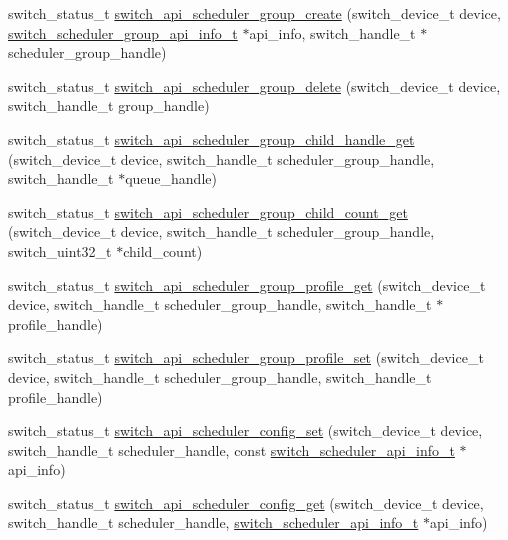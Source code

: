 \begin{DoxyCompactItemize}
\item 
switch\+\_\+status\+\_\+t \hyperlink{group__Scheduler_ga0c6971efaa94e45ddad4dc7f2a00b820}{switch\+\_\+api\+\_\+scheduler\+\_\+group\+\_\+create} (switch\+\_\+device\+\_\+t device, \hyperlink{structswitch__scheduler__group__api__info__}{switch\+\_\+scheduler\+\_\+group\+\_\+api\+\_\+info\+\_\+t} $\ast$api\+\_\+info, switch\+\_\+handle\+\_\+t $\ast$scheduler\+\_\+group\+\_\+handle)
\item 
switch\+\_\+status\+\_\+t \hyperlink{group__Scheduler_ga50131105ac33286610c4fb98da8d0be4}{switch\+\_\+api\+\_\+scheduler\+\_\+group\+\_\+delete} (switch\+\_\+device\+\_\+t device, switch\+\_\+handle\+\_\+t group\+\_\+handle)
\item 
switch\+\_\+status\+\_\+t \hyperlink{group__Scheduler_ga63059e09351364ae8b5ea84e6d4f8779}{switch\+\_\+api\+\_\+scheduler\+\_\+group\+\_\+child\+\_\+handle\+\_\+get} (switch\+\_\+device\+\_\+t device, switch\+\_\+handle\+\_\+t scheduler\+\_\+group\+\_\+handle, switch\+\_\+handle\+\_\+t $\ast$queue\+\_\+handle)
\item 
switch\+\_\+status\+\_\+t \hyperlink{group__Scheduler_gad5c3da4da4d6fd8a015512b4b50bb0b5}{switch\+\_\+api\+\_\+scheduler\+\_\+group\+\_\+child\+\_\+count\+\_\+get} (switch\+\_\+device\+\_\+t device, switch\+\_\+handle\+\_\+t scheduler\+\_\+group\+\_\+handle, switch\+\_\+uint32\+\_\+t $\ast$child\+\_\+count)
\item 
switch\+\_\+status\+\_\+t \hyperlink{group__Scheduler_ga28b0295a359b1d9e190936995877365a}{switch\+\_\+api\+\_\+scheduler\+\_\+group\+\_\+profile\+\_\+get} (switch\+\_\+device\+\_\+t device, switch\+\_\+handle\+\_\+t scheduler\+\_\+group\+\_\+handle, switch\+\_\+handle\+\_\+t $\ast$profile\+\_\+handle)
\item 
switch\+\_\+status\+\_\+t \hyperlink{group__Scheduler_ga570ab46c52ed357fd0aa585733805f11}{switch\+\_\+api\+\_\+scheduler\+\_\+group\+\_\+profile\+\_\+set} (switch\+\_\+device\+\_\+t device, switch\+\_\+handle\+\_\+t scheduler\+\_\+group\+\_\+handle, switch\+\_\+handle\+\_\+t profile\+\_\+handle)
\item 
switch\+\_\+status\+\_\+t \hyperlink{group__Scheduler_gab2e1ad365063f32962b89f163f88a4b5}{switch\+\_\+api\+\_\+scheduler\+\_\+config\+\_\+set} (switch\+\_\+device\+\_\+t device, switch\+\_\+handle\+\_\+t scheduler\+\_\+handle, const \hyperlink{group__Scheduler_ga3e981ad1a349d10503bfbba6cd3b2f0d}{switch\+\_\+scheduler\+\_\+api\+\_\+info\+\_\+t} $\ast$api\+\_\+info)
\item 
switch\+\_\+status\+\_\+t \hyperlink{group__Scheduler_ga1ef3f8aebe0319ef09668fcb2f5a1e79}{switch\+\_\+api\+\_\+scheduler\+\_\+config\+\_\+get} (switch\+\_\+device\+\_\+t device, switch\+\_\+handle\+\_\+t scheduler\+\_\+handle, \hyperlink{group__Scheduler_ga3e981ad1a349d10503bfbba6cd3b2f0d}{switch\+\_\+scheduler\+\_\+api\+\_\+info\+\_\+t} $\ast$api\+\_\+info)

\end{DoxyCompactItemize}
